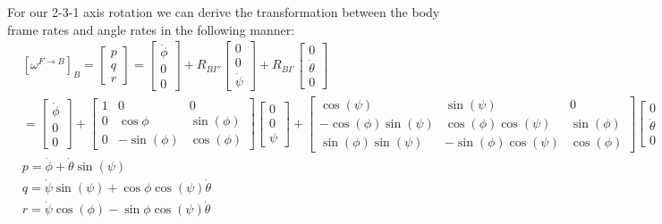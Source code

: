 \documentclass{article}
\begin{document}
For our 2-3-1 axis rotation we can derive the transformation between the body frame rates and angle rates in the following manner:
\begin{align*}
    & [\omega^{F \to B}]_B = \begin{bmatrix} p \\ q \\ r \end{bmatrix} = \begin{bmatrix} \dot{\phi} \\ 0 \\ 0 \end{bmatrix} + R_{BI''} \begin{bmatrix} 0 \\ 0 \\ \dot{\psi} \end{bmatrix} + R_{BI'} \begin{bmatrix} 0 \\ \dot{\theta} \\ 0 \end{bmatrix} \\
    & = \begin{bmatrix} \dot{\phi} \\ 0 \\ 0 \end{bmatrix} + \begin{bmatrix} 1 & 0 & 0 \\ 0 & \cos{\phi} & \sin(\phi) \\ 0 & -\sin(\phi) & \cos(\phi) \end{bmatrix} \begin{bmatrix} 0 \\ 0 \\ \psi \end{bmatrix} + \begin{bmatrix}\cos(\psi) & \sin(\psi) & 0 \\ -\cos(\phi) \sin(\psi) & \cos(\phi) \cos(\psi) & \sin(\phi) \\ \sin(\phi) \sin(\psi) & -\sin(\phi) \cos(\psi) & \cos(\phi)\end{bmatrix} \begin{bmatrix} 0 \\ \dot{\theta} \\ 0 \end{bmatrix} \\
    & p = \dot{\phi} + \dot{\theta}\sin(\psi) \\
    & q = \dot{\psi}\sin(\psi) + \cos{\phi}\cos(\psi) \dot{\theta} \\
    & r = \dot{\psi}\cos(\phi) - \sin{\phi}\cos(\psi) \dot{\theta}
\end{align*}
\end{document}
